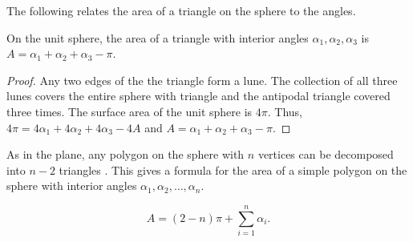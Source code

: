 The following relates the area of a triangle on the sphere to the angles.

\begin{lemma}\label{lem:spherical-triangle}
On the unit sphere, the area of a triangle with interior angles $\alpha_1, \alpha_2, \alpha_3$
is $A=\alpha_1+\alpha_2+\alpha_3-\pi$.
\end{lemma}

\begin{proof}
	Any two edges of the the triangle form a lune. The collection of 
	all three lunes covers the entire sphere with triangle and the antipodal triangle covered three times.
 	The surface area of the unit sphere is $4\pi$.
	Thus, $4\pi=4\alpha_1+4\alpha_2+4\alpha_3-4A$
	and $A=\alpha_1+\alpha_2+\alpha_3-\pi$.
\end{proof}

As in the plane, any polygon on the sphere with $n$ vertices can be decomposed
into $n-2$ triangles \cite{orourke_computational_1994}. This gives a formula for the area of a simple polygon
on the sphere with interior angles $\alpha_1,\alpha_2,\ldots, \alpha_n$.

\begin{equation} \label{eqn:sphere-area}
	A=(2-n)\pi +\sum_{i=1}^n \alpha_i.
\end{equation}






